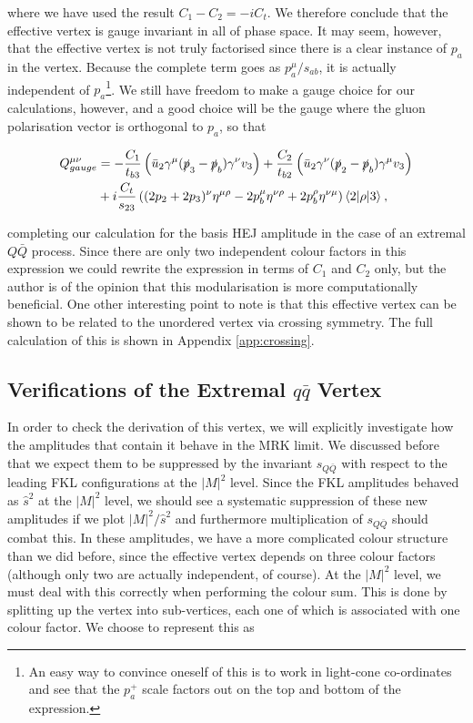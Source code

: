 where we have used the result $C_1 - C_2 = -iC_t$. We therefore conclude that the effective vertex is gauge invariant in all of phase space. It may seem, however, that the effective vertex is not truly factorised since there is a clear instance of $p_a$ in the vertex. Because the complete term goes as $p_a^\mu/s_{ab}$, it is actually independent of $p_a$\footnote{An easy way to convince oneself of this is to work in light-cone co-ordinates and see that the $p_a^+$ scale factors out on the top and bottom of the expression.}. We still have freedom to make a gauge choice for our calculations, however, and a good choice will be the gauge where the gluon polarisation vector is orthogonal to $p_a$, so that %

\begin{equation}
\begin{split}
Q^{\mu \nu}_{gauge} &= -\frac{C_1}{t_{b3}} \left(\bar{u}_2 \gamma^\mu (\slashed{p}_3-\slashed{p}_b)\gamma^\nu v_3 \right) + \frac{C_2}{t_{b2}} \left( \bar{u}_2 \gamma^\nu (\slashed{p}_2-\slashed{p}_b) \gamma^\mu v_3 \right)  \\
&+ i  \frac{C_t}{s_{23}} \left((2p_2+2p_3)^\nu \eta^{\mu \rho} - 2p_b^\mu \eta^{\nu \rho} + 2p_b^\rho \eta^{\nu \mu} \right) \mathinner{\langle2\vert\rho\vert3\rangle}_{},
\end{split}
\end{equation}

completing our calculation for the basis HEJ amplitude in the case of an extremal $Q \bar{Q}$ process. Since there are only two independent colour factors in this expression we could rewrite the expression in terms of $C_1$ and $C_2$ only, but the author is of the opinion that this modularisation is more computationally beneficial. One other interesting point to note is that this effective vertex can be shown to be related to the unordered vertex via crossing symmetry. The full calculation of this is shown in Appendix \ref{app:crossing}. 

\subsection{Verifications of the Extremal $q\bar{q}$ Vertex}

In order to check the derivation of this vertex, we will explicitly investigate how the amplitudes that contain it behave in the MRK limit. We discussed before that we expect them to be suppressed by the invariant $s_{Q\bar{Q}}$ with respect to the leading FKL configurations at the $|M|^2$ level. Since the FKL amplitudes behaved as $\hat{s}^2$ at the $|M|^2$ level, we should see a systematic suppression of these new amplitudes if we plot $|M|^2/\hat{s}^2$ and furthermore multiplication of $s_{Q \bar{Q}}$ should combat this. In these amplitudes, we have a more complicated colour structure than we did before, since the effective vertex depends on three colour factors (although only two are actually independent, of course). At the $|M|^2$ level, we must deal with this correctly when performing the colour sum. This is done by splitting up the vertex into sub-vertices, each one of which is associated with one colour factor. We choose to represent this as

